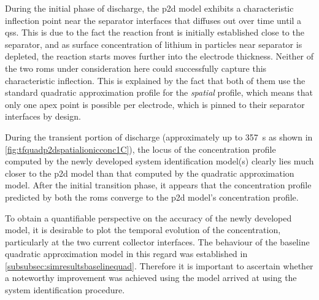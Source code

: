During  the  initial  phase  of   discharge,  the  \gls{p2d}  model  exhibits  a
characteristic inflection point near the  separator interfaces that diffuses out
over time  until a  \gls{qss}. This  is due to  the fact  the reaction  front is
initially established  close to the  separator, and as surface  concentration of
lithium  in particles  near separator  is  depleted, the  reaction starts  moves
further  into the  electrode thickness.  Neither  of the  two \glspl{rom}  under
consideration here  could successfully  capture this  characteristic inflection.
This is  explained by  the fact  that both  of them  use the  standard quadratic
approximation profile for the \emph{spatial}  profile, which means that only one
apex  point is  possible  per  electrode, which  is  pinned  to their  separator
interfaces by design.

During the transient portion of discharge (approximately up to \SI{357}{\second}
as   shown   in \cref{fig:tfquadp2dspatialionicconc1C}),   the  locus   of   the
concentration  profile computed  by  the newly  developed system  identification
model(s) clearly lies  much closer to the \gls{p2d} model  than that computed by
the  quadratic  approximation model.  After  the  initial transition  phase,  it
appears  that  the  concentration  profile predicted  by  both  the  \glspl{rom}
converge to the \gls{p2d} model's concentration profile.


To obtain  a quantifiable  perspective on  the accuracy  of the  newly developed
model, it  is desirable  to plot  the temporal  evolution of  the concentration,
particularly  at  the  two  current   collector  interfaces.  The  behaviour  of
the  baseline  quadratic approximation  model  in  this regard  was  established
in \cref{subsubsec:simresultsbaselinequad}.   Therefore  it   is  important   to
ascertain whether a noteworthy improvement  was achieved using the model arrived
at using the system identification procedure.

